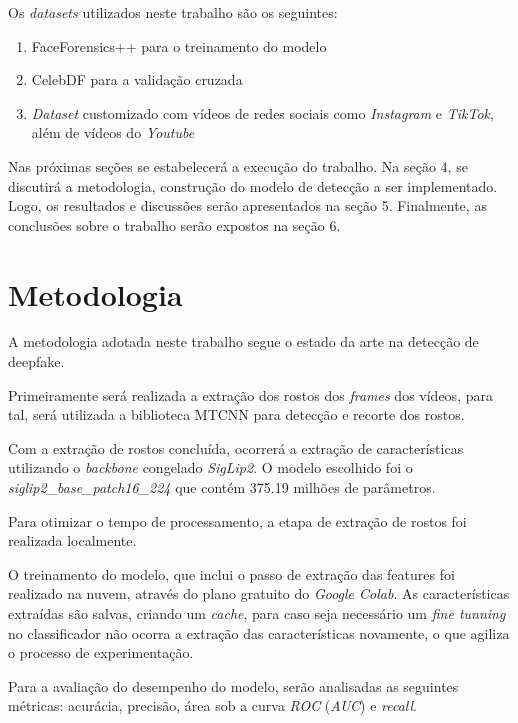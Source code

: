 \documentclass[12pt]{article}
\begin{document}
Os \textit{datasets} utilizados neste trabalho são os seguintes:
\begin{enumerate}
  \item FaceForensics++ para o treinamento do modelo \cite{rosslerFaceForensicsLearningDetect2019}
  \item CelebDF para a validação cruzada \cite{liCelebDFLargescaleChallenging2020}
  \item \textit{Dataset} customizado com vídeos de redes sociais como \textit{Instagram}
   e \textit{TikTok}, além de vídeos do \textit{Youtube}
\end{enumerate}

Nas próximas seções se estabelecerá a execução do trabalho.
Na seção 4, se discutirá a metodologia, construção do modelo de detecção a ser
implementado. Logo, os resultados e 
discussões serão apresentados na seção 5.
Finalmente, as conclusões sobre o trabalho serão expostos na seção 6.

\section{Metodologia}
A metodologia adotada neste trabalho segue o estado da arte na detecção de deepfake.

Primeiramente será realizada a extração dos rostos dos \textit{frames} dos vídeos, para tal,
será utilizada a biblioteca MTCNN para detecção e recorte dos rostos. \cite{7553523,zhang2017detecting}

Com a extração de rostos concluída, ocorrerá a extração de características utilizando o \textit{backbone}
congelado \textit{SigLip2}. O modelo escolhido foi o \textit{siglip2\_base\_patch16\_224}
que contém 375.19 milhões de parâmetros. \cite{tschannen2025siglip2multilingualvisionlanguage}

Para otimizar o tempo de processamento, a etapa de extração de rostos foi realizada localmente.

O treinamento do modelo, que inclui o passo de extração das features foi realizado na nuvem, através do plano
gratuito do \textit{Google Colab}. As características extraídas são salvas, criando um \textit{cache},
para caso seja necessário um \textit{fine tunning} no classificador não ocorra a
extração das características novamente, o que agiliza o processo de experimentação.

Para a avaliação do desempenho do modelo, serão analisadas as seguintes métricas: acurácia, precisão,
área sob a curva \textit{ROC} (\textit{AUC}) e \textit{recall}. \cite{sharmaSystematicLiteratureReview2025}
\end{document}
